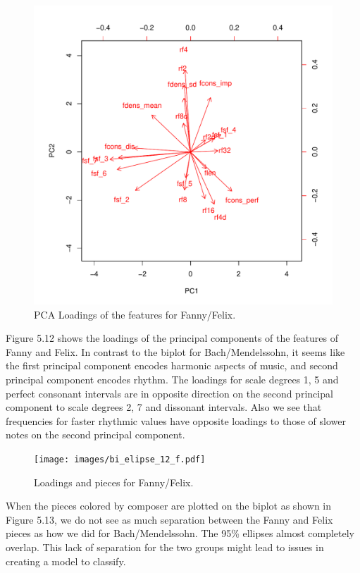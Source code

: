 \documentclass[12pt,twoside]{reedthesis}
\theoremstyle{definition}
\theoremstyle{definition}
\theoremstyle{definition}
\theoremstyle{remark}
\begin{document}
\begin{figure}[H]
\centering
\includegraphics[scale = .7]{images/biplot_f.pdf}
\caption{PCA Loadings of the features for Fanny/Felix.}
\label{subd}
\end{figure}
Figure 5.12 shows the loadings of the principal components of the
features of Fanny and Felix. In contrast to the biplot for
Bach/Mendelssohn, it seems like the first principal component encodes
harmonic aspects of music, and second principal component encodes
rhythm. The loadings for scale degrees 1, 5 and perfect consonant
intervals are in opposite direction on the second principal component to
scale degrees 2, 7 and dissonant intervals. Also we see that frequencies
for faster rhythmic values have opposite loadings to those of slower
notes on the second principal component.
\begin{figure}[H]
\centering
\texttt{[image: images/bi\_elipse\_12\_f.pdf]}
\caption{Loadings and pieces for Fanny/Felix.}
\label{subd}
\end{figure}
When the pieces colored by composer are plotted on the biplot as shown
in Figure 5.13, we do not see as much separation between the Fanny and
Felix pieces as how we did for Bach/Mendelssohn. The 95\% ellipses
almost completely overlap. This lack of separation for the two groups
might lead to issues in creating a model to classify.
\end{document}
